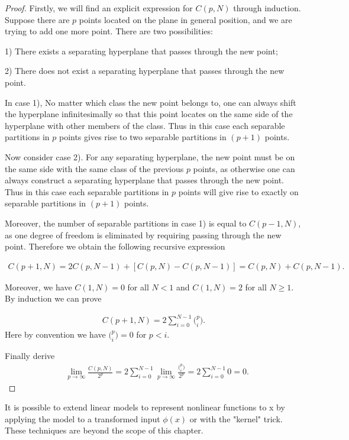 \begin{proof}
Firstly, we will find an explicit expression for $C(p, N)$ through induction. Suppose there are $p$ points located on the plane in general position, and we are trying to add one more point. There are two possibilities:

1) There exists a separating hyperplane that passes through the new point;

2) There does not exist a separating hyperplane that passes through the new point.

In case 1), No matter which class the new point belongs to, one can always shift the hyperplane infinitesimally so that this point locates on the same side of the hyperplane with other members of the class. Thus in this case each separable partitions in $p$ points gives rise to two separable partitions in $(p+1)$ points. 

Now consider case 2). For any separating hyperplane, the new point must be on the same side with the same class of the previous $p$ points, as otherwise one can always construct a separating hyperplane that passes through the new point. Thus in this case each separable partitions in $p$ points will give rise to exactly on separable partitions in $(p+1)$ points. 

Moreover, the number of separable partitions in case 1) is equal to $C(p-1, N)$, as one degree of freedom is eliminated by requiring passing through the new point. Therefore we obtain the following recursive expression

\begin{align*}
C(p+1, N) = 2C(p,N-1) + [C(p,N)-C(p, N-1)] = C(p,N) + C(p, N-1).
\end{align*}

Moreover, we have $C(1, N)=0$ for all $N<1$ and $C(1, N)=2$ for all $N\ge 1$. By induction we can prove

\begin{align*}
C(p+1,N) = 2\sum_{i=0}^{N-1}\big(^p_i\big).
\end{align*}
Here by convention we have $\big(^p_i\big)=0$ for $p<i$.

Finally derive
\begin{align*}
&\lim_{p\rightarrow\infty}\frac{C(p,N)}{2^p}
=2\sum_{i=0}^{N-1}\lim_{p\rightarrow\infty}\frac{\big(^p_i\big)}{2^p}
=2\sum_{i=0}^{N-1}0
=0.
\end{align*}
\end{proof}

It is possible to extend linear models to represent nonlinear functions to x by applying the model to a transformed input $\phi(x)$ or with the "kernel" trick. These techniques are beyond the scope of this chapter.

